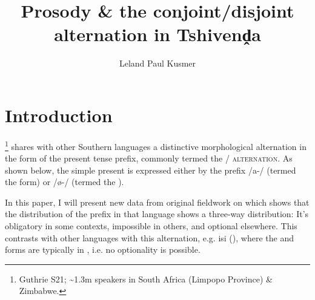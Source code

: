 \documentclass[output=paper,modfonts,nonflat,draftmode]{langsci/langscibook}
\title{Prosody \& the conjoint\slash disjoint alternation in {T}shivenḓa}
\author{Leland Paul Kusmer\affiliation{University of Massachusetts at Amherst}}
\begin{document}
\maketitle 

\section{Introduction}\label{sec:kusmer:intro}

\footnote{Guthrie S21; \textasciitilde 1.3m speakers in South
Africa (Limpopo Province) \& Zimbabwe.} shares with other Southern 
	languages a distinctive morphological alternation in the form of the
	present tense prefix, commonly termed the \textsc{\slash {}
	alternation}. As shown below, the simple present is expressed either by the
	prefix /a-/ (termed the  form) or /\o-/ (termed the ).




In this paper, I will present new data from original fieldwork on 
which shows that the distribution of the  prefix in that language shows
a three-way distribution: It's obligatory in some contexts, impossible in
others, and optional elsewhere. This contrasts with other languages with this
alternation, e.g. isi (\citealt{Halpert2015}), where the  and
 forms are typically in , i.e. no optionality
is possible. 
\end{document}
